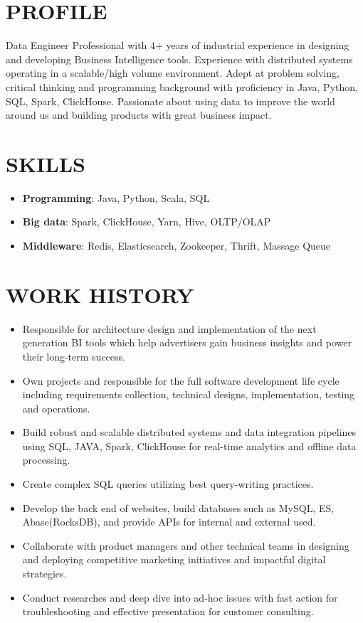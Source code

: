 \documentclass{resume}
\begin{document}

 
\section{PROFILE}
Data Engineer Professional with 4+ years of industrial experience in designing and developing Business Intelligence tools.
Experience with distributed systems operating in a scalable/high volume environment.
Adept at problem solving, critical thinking and programming background with proficiency in Java, Python, SQL, Spark, ClickHouse.
Passionate about using data to improve the world around us and building products with great business impact.

\section{SKILLS}
\begin{itemize}[parsep=0.2ex]
  \item \textbf{Programming}: Java, Python, Scala, SQL
  \item \textbf{Big data}: Spark, ClickHouse, Yarn, Hive, OLTP/OLAP
  \item \textbf{Middleware}: Redis, Elasticsearch, Zookeeper, Thrift, Massage Queue
\end{itemize}

\section{WORK HISTORY}
\begin{itemize}
  \item Responsible for architecture design and implementation of the next generation BI tools 
  which help advertisers gain business insights and power their long-term success.
  \item Own projects and responsible for the full software development life cycle 
  including requirements collection, technical designs, implementation, testing and operations.
  \item Build robust and scalable distributed systems and data integration pipelines 
  using SQL, JAVA, Spark, ClickHouse for real-time analytics and offline data processing. 
  \item Create complex SQL queries utilizing best query-writing practices.
  \item Develop the back end of websites, build databases such as MySQL, ES, Abase(RocksDB), and provide APIs for internal and external used.
  \item Collaborate with product managers and other technical teams in designing and deploying competitive marketing initiatives and impactful digital strategies.
  \item Conduct researches and deep dive into ad-hoc issues with fast action for troubleshooting and effective presentation for customer consulting.
  
\end{itemize}
\end{document}
